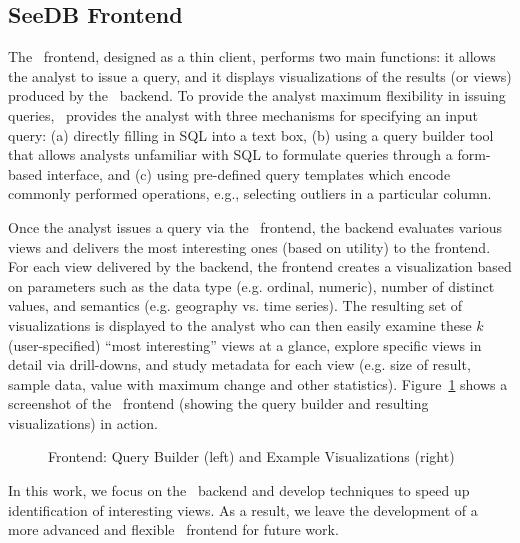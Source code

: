 

\subsection{SeeDB Frontend}
\label{sec:SeeDB_frontend}

The \SeeDB\ frontend, designed as a thin client, performs two main functions: it
allows the analyst to issue a query, 
and it displays visualizations of the results (or views) produced by the \SeeDB\
backend.
To provide the analyst maximum flexibility in issuing queries, \SeeDB\
provides the analyst with three
mechanisms for specifying an input query: 
(a) directly filling in SQL into a text box, 
(b) using a query builder tool that allows analysts
unfamiliar with SQL to formulate queries through a form-based interface, and (c)
using pre-defined query templates which encode commonly performed operations,
e.g., selecting outliers in a particular column. 

Once the analyst issues a query via the \SeeDB\ frontend, the backend
evaluates various views and delivers the most interesting ones (based on
utility) to the frontend.
For each view delivered by the backend, the frontend creates a visualization
based on parameters such as the data
type (e.g. ordinal, numeric), number of distinct values, and semantics (e.g.
geography vs. time series).
The resulting set of  visualizations is displayed to the analyst who can then
easily examine these $k$ (user-specified) ``most interesting'' views at a glance, 
explore specific views in detail via drill-downs, 
and study metadata for each view (e.g. size of result, sample data, value with
maximum change and other statistics). 
Figure~\ref{fig:frontend1} shows a screenshot of the \SeeDB\ frontend (showing
the query builder and resulting visualizations) in action.
 
\begin{figure}[htb]
\vspace{-15pt}
\centerline{
\hbox{}
\hbox{}}
\vspace{-15pt}
\caption{Frontend: Query Builder (left) and Example Visualizations
(right)}
\label{fig:frontend1}
\vspace{-10pt}
\end{figure} 

In this work, we focus on the \SeeDB\ backend and develop techniques to
speed up identification of interesting views. As a result, we leave the
development of a more advanced and flexible \SeeDB\ frontend for future work. 
